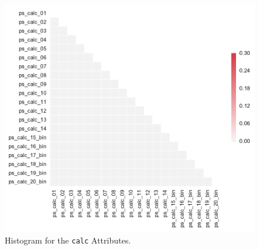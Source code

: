 \documentclass{standalone}
\begin{document}
\begin{figure}[!bt]
\centering
\includegraphics[width=.5\textwidth]{fig/corr_calc_col.pdf}
\caption{Histogram for the \lstinline{calc} Attributes.}
\label{corr_calc}
\end{figure}
\end{document}
